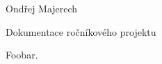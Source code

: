 \documentclass{article}
\begin{document}
\begin{flushright}
  Ondřej Majerech
\end{flushright}
\begin{center}
  \Huge Dokumentace ročníkového projektu
\end{center}
Foobar.
\end{document}

